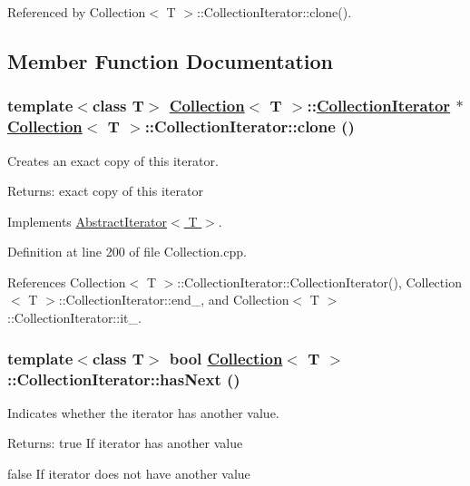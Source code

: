 Referenced by Collection$<$ T $>$::Collection\-Iterator::clone().

\subsection{Member Function Documentation}
\hypertarget{classCollection_1_1CollectionIterator_a1}{
\subsubsection[clone]{\setlength{\rightskip}{0pt plus 5cm}template$<$class T$>$ \hyperlink{classCollection}{Collection}$<$ T $>$::\hyperlink{classCollection_1_1CollectionIterator}{Collection\-Iterator} $\ast$ \hyperlink{classCollection}{Collection}$<$ T $>$::Collection\-Iterator::clone ()}}
\label{classCollection_1_1CollectionIterator_a1}


Creates an exact copy of this iterator. \begin{Desc}
\item[Returns:]exact copy of this iterator \end{Desc}


Implements \hyperlink{classAbstractIterator_a0}{Abstract\-Iterator$<$ T $>$}.

Definition at line 200 of file Collection.cpp.

References Collection$<$ T $>$::Collection\-Iterator::Collection\-Iterator(), Collection$<$ T $>$::Collection\-Iterator::end\_\-, and Collection$<$ T $>$::Collection\-Iterator::it\_\-.\hypertarget{classCollection_1_1CollectionIterator_a2}{
\subsubsection[hasNext]{\setlength{\rightskip}{0pt plus 5cm}template$<$class T$>$ bool \hyperlink{classCollection}{Collection}$<$ T $>$::Collection\-Iterator::has\-Next ()}}
\label{classCollection_1_1CollectionIterator_a2}


Indicates whether the iterator has another value. \begin{Desc}
\item[Returns:]true If iterator has another value 

false If iterator does not have another value \end{Desc}


